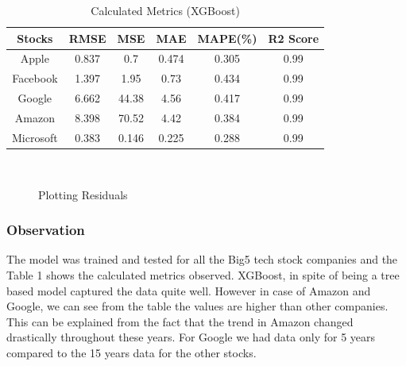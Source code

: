 \usepackage{fancyhdr}\documentclass[conference]{IEEEtran}
\begin{document}
\begin{table}[h]
\renewcommand{\arraystretch}{1.3}
\caption{Calculated Metrics (XGBoost)}
\label{tab:example}
\centering
\begin{tabular}{|c|c|c|c|c|c|}
    \hline
    Stocks  &  RMSE & MSE & MAE & MAPE(\%) & R2 Score\\
    \hline
    \hline
    Apple   &   0.837 & 0.7 & 0.474 & 0.305 & 0.99\\
    \hline
    Facebook   &   1.397 & 1.95 & 0.73 & 0.434 & 0.99\\
    \hline
    Google   &   6.662 & 44.38 & 4.56 & 0.417 & 0.99\\
    \hline
    Amazon   &   8.398 & 70.52 & 4.42 & 0.384 & 0.99\\
    \hline
    Microsoft   &   0.383 & 0.146 & 0.225 & 0.288 & 0.99\\
    \hline
\end{tabular}
\end{table}
\\
\begin{figure}[h]
    \centering
    \caption{Plotting Residuals}
    \label{fig:sample_subfigures}
\end{figure}
\subsubsection{Observation}
The model was trained and tested for all the Big5 tech stock companies and the Table 1 shows the calculated metrics observed. XGBoost, in spite of being a tree based model captured the data quite well. However in case of Amazon and Google, we can see from the table the values are higher than other companies. This can be explained from the fact that the trend in Amazon changed drastically throughout these years. For Google we had data only for 5 years compared to the 15 years data for the other stocks.
\end{document}
